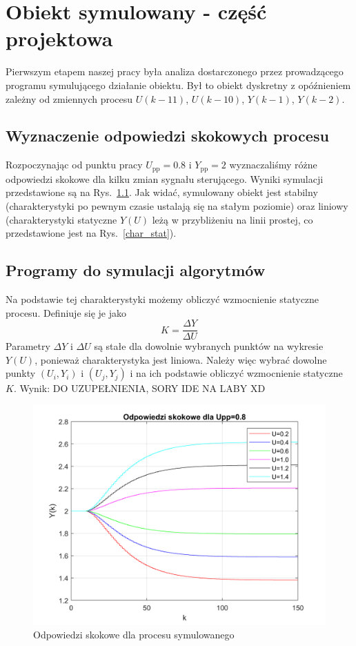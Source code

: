 \chapter{Obiekt symulowany - część projektowa}
Pierwszym etapem naszej pracy była analiza dostarczonego przez prowadzącego programu symulującego działanie obiektu. Był to obiekt dyskretny z opóźnieniem zależny od zmiennych procesu $U(k-11)$, $U(k-10)$, $Y(k-1)$, $Y(k-2)$.

\section{Wyznaczenie odpowiedzi skokowych procesu}
Rozpoczynając od punktu pracy $U_{\mathrm{pp}}=\num{0,8}$ i $Y_{\mathrm{pp}}=2$ wyznaczaliśmy różne odpowiedzi skokowe dla kilku zmian sygnału sterującego. Wyniki symulacji przedstawione są na Rys.~\ref{os}. Jak widać, symulowany obiekt jest stabilny (charakterystyki po pewnym czasie ustalają się na stałym poziomie) oraz liniowy (charakterystyki statyczne $Y(U)$ leżą w przybliżeniu na linii prostej, co przedstawione jest na Rys.~\ref{char_stat}).
\section{Programy do symulacji algorytmów}

Na podstawie tej charakterystyki możemy obliczyć wzmocnienie statyczne procesu. Definiuje się je jako
\begin{equation}
K=\frac{\Delta Y}{\Delta U}
\end{equation}
Parametry $\Delta Y$ i $\Delta U$ są stałe dla dowolnie wybranych punktów na wykresie $Y(U)$, ponieważ charakterystyka jest liniowa. Należy więc wybrać dowolne punkty $(U_i, Y_i)$ i $(U_j, Y_j)$ i na ich podstawie obliczyć wzmocnienie statyczne $K$. Wynik:
{\huge DO UZUPEŁNIENIA, SORY IDE NA LABY XD}

\begin{figure}
\label{os}
\centering
\caption{Odpowiedzi skokowe dla procesu symulowanego}
\includegraphics{odpsk.png}
\end{figure}

